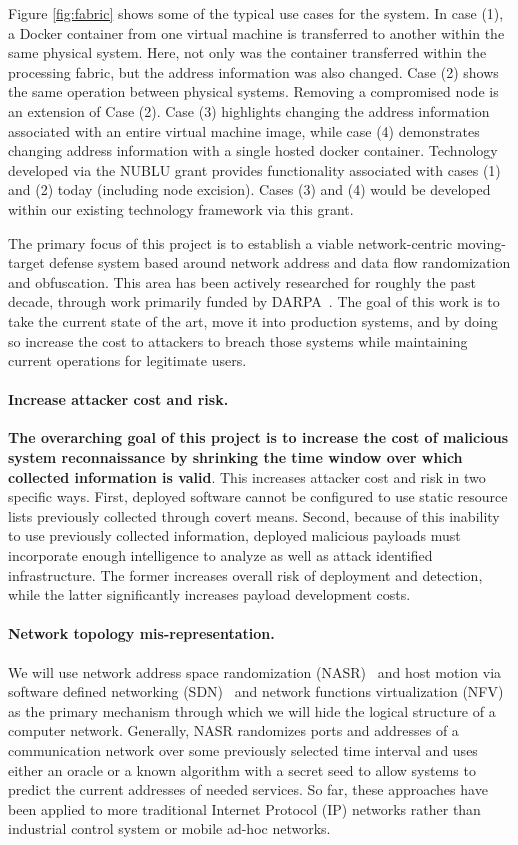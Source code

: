 \documentclass{sbir}
\begin{document}
Figure \ref{fig:fabric} shows some of the typical use cases for the system. In case (1), a Docker container from one virtual machine is transferred to another within the same physical system. Here, not only was the container transferred within the processing fabric, but the address information was also changed.  Case (2) shows the same operation between physical systems. Removing a compromised node is an extension of Case (2).  Case (3) highlights changing the address information associated with an entire virtual machine image, while case (4) demonstrates changing address information with a single hosted docker container.  Technology developed via the NUBLU grant provides functionality associated with cases (1) and (2) today (including node excision).  Cases (3) and (4) would be developed within our existing technology framework via this grant.

The primary focus of this project is to establish a viable network-centric moving-target defense system based around network address and data flow randomization and obfuscation.  This area has been actively researched for roughly the past decade, through work primarily funded by DARPA~\cite{KeFiLo:01}. The goal of this work is to take the current state of the art, move it into production systems, and by doing so increase the cost to attackers to breach those systems while maintaining current operations for legitimate users.

\paragraph{Increase attacker cost and risk.}
{\bf The overarching goal of this project is to increase the cost of malicious system reconnaissance by shrinking the time window over which collected information is valid}.  This increases attacker cost and risk in two specific ways. First, deployed software cannot be configured to use static resource lists previously collected through covert means. Second, because of this inability to use previously collected information, deployed malicious payloads must incorporate enough intelligence to analyze as well as attack identified infrastructure.  The former increases overall risk of deployment and detection, while the latter significantly increases payload development costs.

\paragraph{Network topology mis-representation.}
We will use network address space randomization (NASR)~\cite{KeFiLo:01,AtPaWe:03,AnAkPe:07} and host motion via software defined networking (SDN)~\cite{JaAlDu:12} and network functions virtualization (NFV) as the primary mechanism through which we will hide the logical structure of a computer network.  Generally, NASR randomizes ports and addresses of a communication network over some previously selected time interval and uses either an oracle or a known algorithm with a secret seed to allow systems to predict the current addresses of needed services. So far, these approaches have been applied to more traditional Internet Protocol (IP) networks rather than industrial control system or mobile ad-hoc networks.
\end{document}

